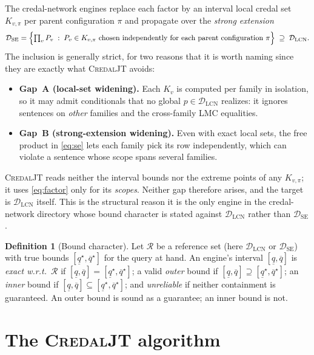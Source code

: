 \documentclass[11pt]{article}
\theoremstyle{definition}
\newtheorem{definition}{Definition}
\newcommand{\lo}{\underline}
\newcommand{\hi}{\overline}
\newcommand{\DSE}{\mathcal{D}_{\mathrm{SE}}}
\newcommand{\DLCN}{\mathcal{D}_{\mathrm{LCN}}}
\begin{document}
The credal-network engines replace each factor by an interval local credal set
$K_{v,\pi}$ per parent configuration $\pi$ and propagate over the \emph{strong
extension}
\begin{equation}\label{eq:se}
  \DSE=\Bigl\{\textstyle\prod_v P_v\;:\;P_v\in K_{v,\pi}
  \text{ chosen independently for each parent configuration }\pi\Bigr\}
  \;\supseteq\;\DLCN .
\end{equation}
The inclusion is generally strict, for two reasons that it is worth naming since
they are exactly what \textsc{CredalJT} avoids:
\begin{itemize}
  \item \textbf{Gap~A (local-set widening).} Each $K_v$ is computed per family in
    isolation, so it may admit conditionals that no global $p\in\DLCN$ realizes:
    it ignores sentences on \emph{other} families and the cross-family LMC
    equalities.
  \item \textbf{Gap~B (strong-extension widening).} Even with exact local sets,
    the free product in \eqref{eq:se} lets each family pick its row
    independently, which can violate a sentence whose scope spans several
    families.
\end{itemize}
\textsc{CredalJT} reads neither the interval bounds nor the extreme points of any
$K_{v,\pi}$; it uses \eqref{eq:factor} only for its \emph{scopes}. Neither gap
therefore arises, and the target is $\DLCN$ itself. This is the
structural reason it is the only engine in the credal-network directory whose
bound character is stated against $\DLCN$ rather than $\DSE$.

\begin{definition}[Bound character]\label{def:char}
Let $\mathcal R$ be a reference set (here $\DLCN$ or $\DSE$) with true bounds
$[\lo q^\star,\hi q^\star]$ for the query at hand. An engine's interval
$[\lo q,\hi q]$ is \emph{exact w.r.t.\ $\mathcal R$} if
$[\lo q,\hi q]=[\lo q^\star,\hi q^\star]$; a valid \emph{outer} bound if
$[\lo q,\hi q]\supseteq[\lo q^\star,\hi q^\star]$; an \emph{inner} bound if
$[\lo q,\hi q]\subseteq[\lo q^\star,\hi q^\star]$; and \emph{unreliable} if
neither containment is guaranteed. An outer bound is sound as a guarantee; an
inner bound is not.
\end{definition}

\section{The \textsc{CredalJT} algorithm}\label{sec:algo}
\end{document}

